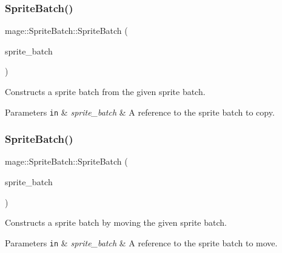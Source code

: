 \subsubsection{\texorpdfstring{Sprite\+Batch()}{SpriteBatch()}\hspace{0.1cm}{\footnotesize\ttfamily [3/4]}}
{\footnotesize\ttfamily mage\+::\+Sprite\+Batch\+::\+Sprite\+Batch (\begin{DoxyParamCaption}\item[{const \hyperlink{classmage_1_1_sprite_batch}{Sprite\+Batch} \&}]{sprite\+\_\+batch }\end{DoxyParamCaption})\hspace{0.3cm}{\ttfamily [delete]}}

Constructs a sprite batch from the given sprite batch.


\begin{DoxyParams}[1]{Parameters}
\mbox{\tt in}  & {\em sprite\+\_\+batch} & A reference to the sprite batch to copy. \\
\hline
\end{DoxyParams}
\hypertarget{classmage_1_1_sprite_batch_a16f89aba054d8a08e5257c46813f4713}{}\label{classmage_1_1_sprite_batch_a16f89aba054d8a08e5257c46813f4713} 
\subsubsection{\texorpdfstring{Sprite\+Batch()}{SpriteBatch()}\hspace{0.1cm}{\footnotesize\ttfamily [4/4]}}
{\footnotesize\ttfamily mage\+::\+Sprite\+Batch\+::\+Sprite\+Batch (\begin{DoxyParamCaption}\item[{\hyperlink{classmage_1_1_sprite_batch}{Sprite\+Batch} \&\&}]{sprite\+\_\+batch }\end{DoxyParamCaption})\hspace{0.3cm}{\ttfamily [default]}}

Constructs a sprite batch by moving the given sprite batch.


\begin{DoxyParams}[1]{Parameters}
\mbox{\tt in}  & {\em sprite\+\_\+batch} & A reference to the sprite batch to move. \\
\hline
\end{DoxyParams}
\hypertarget{classmage_1_1_sprite_batch_a1c284e2c0ed96081f9f2fb1f84e5817f}{}\label{classmage_1_1_sprite_batch_a1c284e2c0ed96081f9f2fb1f84e5817f} 
